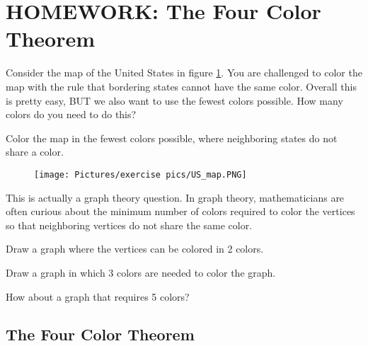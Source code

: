
\section{HOMEWORK: The Four Color Theorem}

Consider the map  of the United States in figure \ref{map}. You are challenged to color the map with the rule that bordering states cannot have the same color. Overall this is pretty easy, BUT we also want to use the fewest colors possible. How many colors do you need to do this?

\begin{exercise}
Color the map in the fewest colors possible, where neighboring states do not share a color.
\end{exercise}

\begin{figure}[h]
    \centering
    \texttt{[image: Pictures/exercise pics/US\_map.PNG]}
    \label{map}
\end{figure}

\noindent This is actually a graph theory question. In graph theory, mathematicians are often curious about the minimum number of colors required to color the vertices so that neighboring vertices do not share the same color. 

\newpage

\begin{exercise}
Draw a graph where the vertices can be colored in 2 colors.
\end{exercise}

\vspace{3in}

\begin{exercise}
Draw a graph in which 3 colors are needed to color the graph.
\end{exercise}

\vspace{3in}

\begin{exercise}
How about a graph that requires 5 colors?
\end{exercise}

\vspace{3in}

\subsection{The Four Color Theorem}

